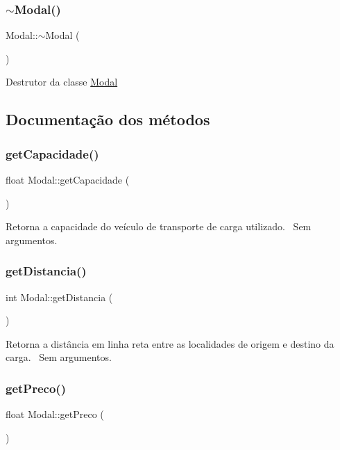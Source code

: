 \subsubsection{\texorpdfstring{$\sim$\+Modal()}{~Modal()}}
{\footnotesize\ttfamily Modal\+::$\sim$\+Modal (\begin{DoxyParamCaption}{ }\end{DoxyParamCaption})}

Destrutor da classe \hyperlink{classModal}{Modal}

\subsection{Documentação dos métodos}
\mbox{\label{classModal_ac9750361d92b6ad91674851852c7362f}} 
\subsubsection{\texorpdfstring{get\+Capacidade()}{getCapacidade()}}
{\footnotesize\ttfamily float Modal\+::get\+Capacidade (\begin{DoxyParamCaption}{ }\end{DoxyParamCaption})}

Retorna a capacidade do veículo de transporte de carga utilizado.~\newline
Sem argumentos.\mbox{\label{classModal_a1eedb4dfdddd81a5a7c7b3203e50e68c}} 
\subsubsection{\texorpdfstring{get\+Distancia()}{getDistancia()}}
{\footnotesize\ttfamily int Modal\+::get\+Distancia (\begin{DoxyParamCaption}{ }\end{DoxyParamCaption})}

Retorna a distância em linha reta entre as localidades de origem e destino da carga.~\newline
Sem argumentos.\mbox{\label{classModal_ae124094018f5e049d5137a8eec893a79}} 
\subsubsection{\texorpdfstring{get\+Preco()}{getPreco()}}
{\footnotesize\ttfamily float Modal\+::get\+Preco (\begin{DoxyParamCaption}{ }\end{DoxyParamCaption})}

